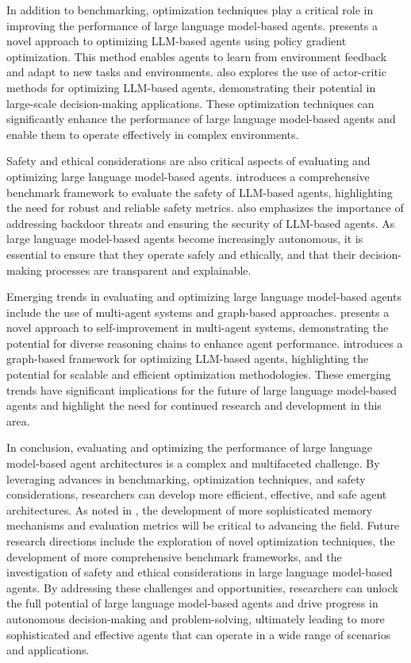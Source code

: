 \documentclass[11pt,a4paper]{article}
\begin{document}
In addition to benchmarking, optimization techniques play a critical role in improving the performance of large language model-based agents. \cite{arxiv:2308.02151} presents a novel approach to optimizing LLM-based agents using policy gradient optimization. This method enables agents to learn from environment feedback and adapt to new tasks and environments. \cite{arxiv:2311.13884} also explores the use of actor-critic methods for optimizing LLM-based agents, demonstrating their potential in large-scale decision-making applications. These optimization techniques can significantly enhance the performance of large language model-based agents and enable them to operate effectively in complex environments.

Safety and ethical considerations are also critical aspects of evaluating and optimizing large language model-based agents. \cite{arxiv:2412.14470} introduces a comprehensive benchmark framework to evaluate the safety of LLM-based agents, highlighting the need for robust and reliable safety metrics. \cite{arxiv:2402.11208} also emphasizes the importance of addressing backdoor threats and ensuring the security of LLM-based agents. As large language model-based agents become increasingly autonomous, it is essential to ensure that they operate safely and ethically, and that their decision-making processes are transparent and explainable.

Emerging trends in evaluating and optimizing large language model-based agents include the use of multi-agent systems and graph-based approaches. \cite{arxiv:2501.05707} presents a novel approach to self-improvement in multi-agent systems, demonstrating the potential for diverse reasoning chains to enhance agent performance. \cite{arxiv:2402.16823} introduces a graph-based framework for optimizing LLM-based agents, highlighting the potential for scalable and efficient optimization methodologies. These emerging trends have significant implications for the future of large language model-based agents and highlight the need for continued research and development in this area.

In conclusion, evaluating and optimizing the performance of large language model-based agent architectures is a complex and multifaceted challenge. By leveraging advances in benchmarking, optimization techniques, and safety considerations, researchers can develop more efficient, effective, and safe agent architectures. As noted in \cite{doi:10.1145/3748302}, the development of more sophisticated memory mechanisms and evaluation metrics will be critical to advancing the field. Future research directions include the exploration of novel optimization techniques, the development of more comprehensive benchmark frameworks, and the investigation of safety and ethical considerations in large language model-based agents. By addressing these challenges and opportunities, researchers can unlock the full potential of large language model-based agents and drive progress in autonomous decision-making and problem-solving, ultimately leading to more sophisticated and effective agents that can operate in a wide range of scenarios and applications.
\end{document}
